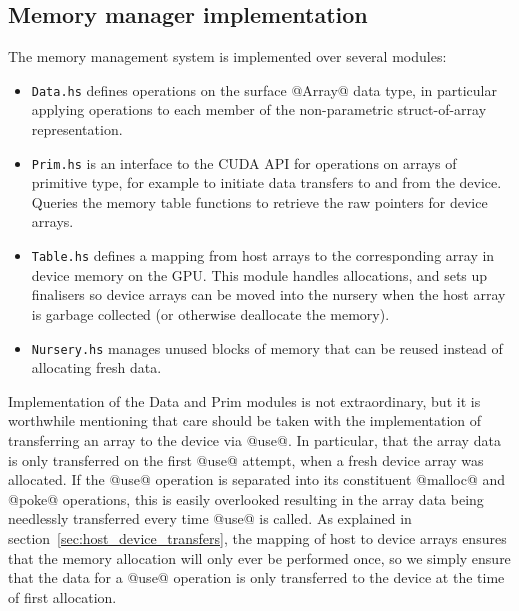 % 

\subsection{Memory manager implementation}
\label{sec:memory_manager_implementation}

The memory management system is implemented over several modules:
%
\begin{itemize}
\item \texttt{Data.hs} defines operations on the surface @Array@ data type, in
    particular applying operations to each member of the non-parametric
    struct-of-array representation.

\item \texttt{Prim.hs} is an interface to the CUDA API for operations on arrays
    of primitive type, for example to initiate data transfers to and from the
    device. Queries the memory table functions to retrieve the raw pointers for
    device arrays.

\item \texttt{Table.hs} defines a mapping from host arrays to the corresponding
    array in device memory on the GPU\@. This module handles allocations, and
    sets up finalisers so device arrays can be moved into the nursery when the
    host array is garbage collected (or otherwise deallocate the memory).

\item \texttt{Nursery.hs} manages unused blocks of memory that can be reused
    instead of allocating fresh data.
\end{itemize}

Implementation of the Data and Prim modules is not extraordinary, but it is
worthwhile mentioning that care should be taken with the implementation of
transferring an array to the device via @use@. In particular, that the
array data is only transferred on the first @use@ attempt, when a fresh
device array was allocated. If the @use@ operation is separated into its
constituent @malloc@ and @poke@ operations, this is easily overlooked
resulting in the array data being needlessly transferred every time @use@
is called. As explained in section~\ref{sec:host_device_transfers}, the mapping
of host to device arrays ensures that the memory allocation will only ever be
performed once, so we simply ensure that the data for a @use@ operation is
only transferred to the device at the time of first allocation.


